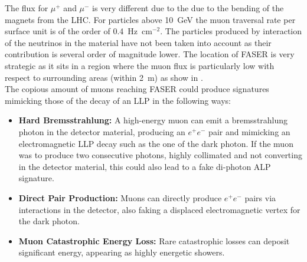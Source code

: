 			The flux for $\mu^+$ and $\mu^-$ is very different due to the due to the bending of the magnets from the LHC. For particles above \SI{10}{\giga\electronvolt} the muon traversal rate per surface unit is of the order of \SI{0.4}{\hertz\centi\meter}$^{-2}$. The particles produced by interaction of the neutrinos in the material have not been taken into account as their contribution is several order of magnitude lower. The location of FASER is very strategic as it sits in a region where the muon flux is particularly low with respect to surrounding areas (within \SI{2}{\meter}) as show in \cite{FASER_techprop}.\\

			The copious amount of muons reaching FASER could produce signatures mimicking those of the decay of an LLP in the following ways:  
			\begin{itemize}
    			\item \textbf{Hard Bremsstrahlung:} A high-energy muon can emit a bremsstrahlung photon in the detector material, producing an $e^+e^-$ pair and mimicking an electromagnetic LLP decay such as the one of the dark photon. If the muon was to produce two consecutive photons, highly collimated and not converting in the detector material, this could also lead to a fake di-photon ALP signature. 
    			\item \textbf{Direct Pair Production:} Muons can directly produce $e^+e^-$ pairs via interactions in the detector, also faking a displaced electromagnetic vertex for the dark photon.
    			\item \textbf{Muon Catastrophic Energy Loss:} Rare catastrophic losses can deposit significant energy, appearing as highly energetic showers.
			\end{itemize}
		
